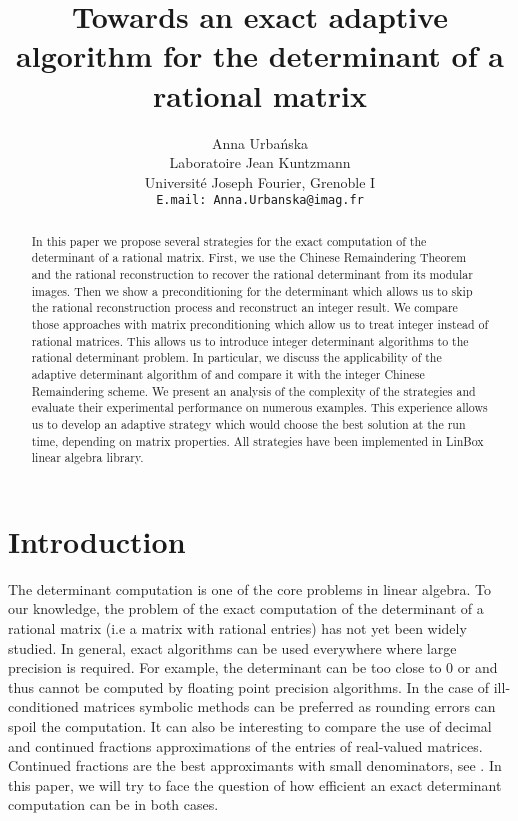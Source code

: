 \documentclass{acm_proc_article-sp}   \usepackage{graphicx,url}
\title{Towards an exact adaptive algorithm for the determinant of a rational matrix}
\author{Anna Urba\'nska\\
Laboratoire Jean Kuntzmann\\
Universit\'e Joseph Fourier, Grenoble I\\
\texttt{E.mail: Anna.Urbanska@imag.fr}\\
}
\date{}
\begin{document}
\maketitle

\begin{abstract}
In this paper we propose several strategies for the exact computation
of the determinant of a rational matrix. First, we use the Chinese
Remaindering Theorem and the rational reconstruction to recover the
rational determinant from its modular images. Then we show a
preconditioning for the determinant which allows us to skip the
rational reconstruction process and reconstruct an integer result. We
compare those approaches with matrix preconditioning which allow us to
treat integer instead of rational matrices. This allows us to introduce
integer determinant algorithms to the rational determinant problem. In particular, we discuss the applicability of the adaptive determinant algorithm of \cite{jgd:2006:det} and compare it with the integer Chinese Remaindering scheme.
We present an analysis of the complexity of the strategies and
evaluate their experimental performance on numerous examples. This
experience allows us to develop an adaptive strategy which would
choose the best solution at the run time, depending on matrix
properties.
All strategies have been implemented in LinBox linear algebra
library.
\end{abstract}

\section{Introduction}
The determinant computation is one of the core problems in linear algebra.
To our knowledge, the problem of the exact computation of the
determinant of a rational matrix (i.e a matrix with rational
entries) has not yet been widely studied. In general, exact
algorithms can be used everywhere where large precision is required.
For example, the determinant can be too close to 0 or 
and thus cannot be computed by floating point precision algorithms.
In the case of ill-conditioned matrices symbolic methods can be
preferred as rounding errors can spoil the computation. It can also
be interesting to compare the use of decimal and continued fractions
approximations of the entries of real-valued matrices. Continued fractions are
the best approximants with small denominators, see \cite[Ch.
4]{gathen}. In this paper, we will try to face the question of how
efficient an exact determinant computation can be in both cases.
\end{document}

